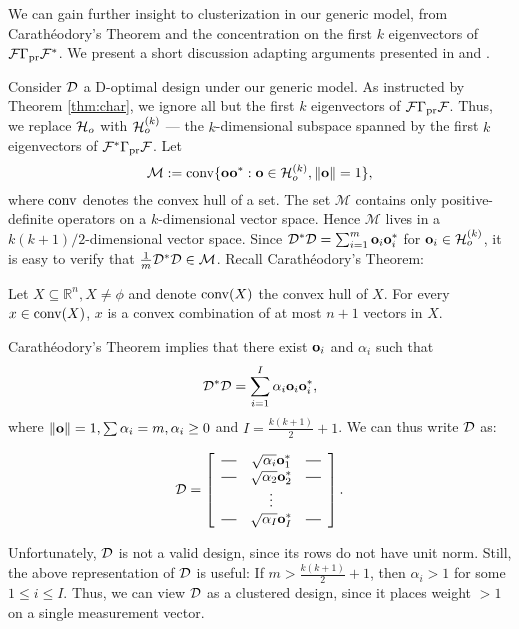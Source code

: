 We can gain further insight to clusterization in our generic model,
from Carath\'eodory's Theorem and the concentration on the first $k$
eigenvectors of $\mathcal{F} \Gamma_{\textup{pr}} \mathcal{F}^*$. We present a short discussion
adapting arguments presented in \cite[Chapter
  3]{silveyOptimalDesign1980} and \cite[Section
  5.2.3]{pronzatoPazman2013}.

Consider $\mathcal{D}$ a D-optimal design under our generic model.  As
instructed by Theorem \ref{thm:char}, we ignore all but the first $k$
eigenvectors of $\mathcal{F} \Gamma_{\textup{pr}} \mathcal{F}$. Thus, we replace $\mathcal{H}_o$ with
$\mathcal{H}_o^{(k)}$ --- the $k$-dimensional subspace spanned by the first
$k$ eigenvectors of $\mathcal{F}^*\Gamma_{\textup{pr}}\mathcal{F}$. Let
\begin{equation*}
  \mathcal{M} := \conv \{\meas \meas^* : \meas\in \hilo^{(k)}, \|\meas\|=1\},
\end{equation*}
where $\operatorname*{conv}$ denotes the convex hull of a set. The set $\mathcal{M}$
contains only positive-definite operators on a $k$-dimensional vector
space. Hence $\mathcal{M}$ lives in a $k(k+1)/2$-dimensional vector
space. Since $\mathcal{D}^*\mathcal{D} = \sum_{i=1}^m \mathbf{o}_i\mathbf{o}_i^*$ for $\mathbf{o}_i
\in \mathcal{H}_o^{(k)}$, it is easy to verify that $\frac1m \mathcal{D}^*\mathcal{D} \in
\mathcal{M}$.  Recall Carath\'eodory's Theorem:
\begin{theorem*}
  Let $X \subseteq \mathbb{R}^n, X \neq \phi$ and denote $\operatorname*{conv} (X)$
  the convex hull of $X$. For every $x \in \operatorname*{conv} (X)$, $x$ is a convex
  combination of at most $n+1$ vectors in $X$.
\end{theorem*}
Carath\'eodory's Theorem implies that there exist $\mathbf{o}_i$ and
$\alpha_i$ such that
\begin{equation*}
  \opt^*\opt = \sum_{i=1}^I \alpha_i \meas_i\meas_i^*,
\end{equation*}
where $\|\mathbf{o}\|=1, \sum\alpha_i = m, \alpha_i \geq 0$ and $I =
\frac{k(k+1)}{2} + 1$. We can thus write $\mathcal{D}$ as:

\[
\opt =
\left[
  \begin{array}{ccc}
    \horzbar & \sqrt{\alpha_i} \meas^*_1 & \horzbar \\
    \horzbar & \sqrt{\alpha_2} \meas_2^* & \horzbar \\
             & \vdots    &          \\
    \horzbar & \sqrt{\alpha_I} \meas_I^* & \horzbar \\
  \end{array}
\right].
\]

Unfortunately, $\mathcal{D}$ is not a valid design, since its rows do not
have unit norm. Still, the above representation of $\mathcal{D}$ is useful:
If $m > \frac{k(k+1)}{2} + 1$, then $\alpha_i > 1$ for some $1\leq i
\leq I$.  Thus, we can view $\mathcal{D}$ as a clustered design, since it
places weight $>1$ on a single measurement vector.
